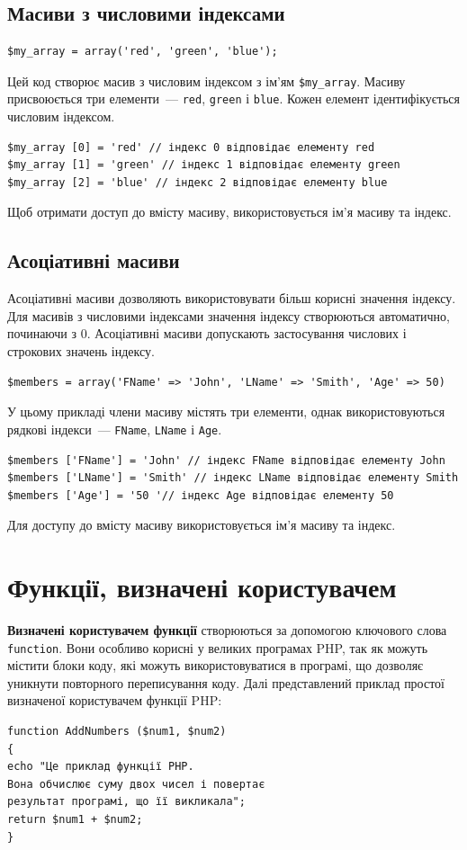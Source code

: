 \subsection*{Масиви з числовими індексами}
\begin{verbatim}
$my_array = array('red', 'green', 'blue'); 
\end{verbatim}
Цей код створює масив з числовим індексом з ім'ям \verb'$my_array'. Масиву присвоюється три елементи~---  \verb|red|,  \verb|green| і  \verb|blue|. Кожен елемент ідентифікується числовим індексом.
\begin{verbatim}
$my_array [0] = 'red' // індекс 0 відповідає елементу red 
$my_array [1] = 'green' // індекс 1 відповідає елементу green 
$my_array [2] = 'blue' // індекс 2 відповідає елементу blue 
\end{verbatim}
Щоб отримати доступ до вмісту масиву, використовується ім'я масиву та індекс. 
\subsection*{Асоціативні масиви}
Асоціативні масиви дозволяють використовувати більш корисні значення індексу. Для масивів з числовими індексами значення індексу створюються автоматично, починаючи з 0. Асоціативні масиви допускають застосування числових і строкових значень індексу.
\begin{verbatim}
$members = array('FName' => 'John', 'LName' => 'Smith', 'Age' => 50) 
\end{verbatim}
У цьому прикладі члени масиву містять три елементи, однак використовуються рядкові індекси~---  \verb|FName|,  \verb|LName| і  \verb|Age|.
\begin{verbatim}
$members ['FName'] = 'John' // індекс FName відповідає елементу John
$members ['LName'] = 'Smith' // індекс LName відповідає елементу Smith
$members ['Age'] = '50 '// індекс Age відповідає елементу 50 
\end{verbatim}
Для доступу до вмісту масиву використовується ім'я масиву та індекс.
\pagebreak[3]
\section{Функції, визначені користувачем}
\nopagebreak[4]
\textbf{Визначені користувачем функції} створюються за допомогою ключового слова \verb'function'. Вони особливо корисні у великих програмах PHP, так як можуть містити блоки коду, які можуть використовуватися в програмі, що дозволяє уникнути повторного переписування коду. Далі представлений приклад простої визначеної користувачем функції PHP:
\begin{verbatim}
function AddNumbers ($num1, $num2)
{
echo "Це приклад функції PHP. 
Вона обчислює суму двох чисел і повертає 
результат програмі, що її викликала";
return $num1 + $num2;
} 
\end{verbatim}


